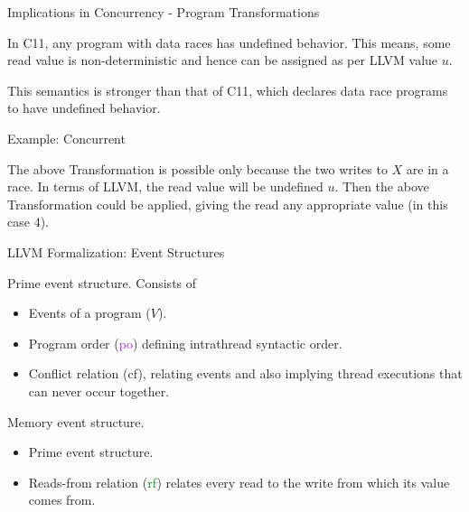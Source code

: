 \documentclass[xcolor=dvipsnames, notes]{beamer}
\newcommand{\po}{\textcolor{BlueViolet}{po}}
\newcommand{\rf}{\textcolor{Green}{rf}}
\newcommand{\cf}{\textcolor{Apricot}{cf}}
\begin{document}
    \begin{frame}{Implications in Concurrency - Program Transformations}

        In C11, any program with data races has undefined behavior.
        This means, some read value is non-deterministic and hence can be assigned as per LLVM value $u$.
        
        This semantics is stronger than that of C11, which declares data race programs to have undefined behavior.

    \end{frame}

    \begin{frame}{Example: Concurrent}

        \begin{figure}
        \end{figure}

        The above Transformation is possible only because the two writes to $X$ are in a race.
        In terms of LLVM, the read value will be undefined $u$.
        Then the above Transformation could be applied, giving the read any appropriate value (in this case $4$).
    
    \end{frame}


    \begin{frame}{LLVM Formalization: Event Structures}

        Prime event structure.
        Consists of 
        \begin{itemize}
            \item Events of a program ($V$). 
            \item Program order ({\po}) defining intrathread syntactic order. 
            \item Conflict relation ({\cf}), relating events and also implying thread executions that can never occur together.
        \end{itemize}
        Memory event structure.
        \begin{itemize}
            \item Prime event structure.
            \item Reads-from relation ({\rf}) relates every read to the write from which its value comes from.
        \end{itemize}
        
    \end{frame}
\end{document}
